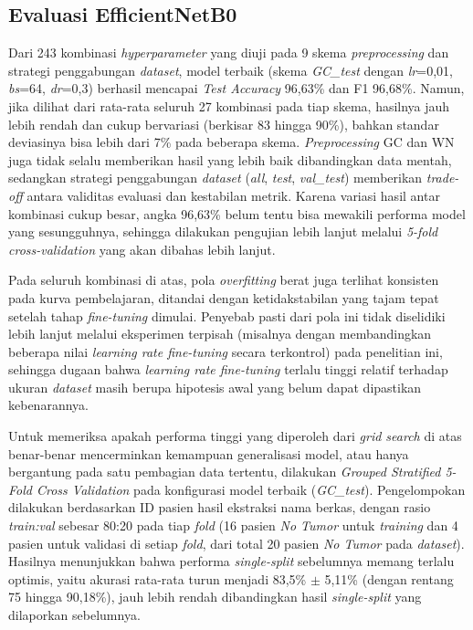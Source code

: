 \subsection{Evaluasi EfficientNetB0}
\label{subsec:efnet}

Dari 243 kombinasi \textit{hyperparameter} yang diuji pada 9 skema \textit{preprocessing} dan strategi penggabungan \textit{dataset}, model terbaik (skema \textit{GC\_test} dengan \textit{lr}=0,01, \textit{bs}=64, \textit{dr}=0,3) berhasil mencapai \textit{Test Accuracy} 96,63\% dan F1 96,68\%. Namun, jika dilihat dari rata-rata seluruh 27 kombinasi pada tiap skema, hasilnya jauh lebih rendah dan cukup bervariasi (berkisar 83 hingga 90\%), bahkan standar deviasinya bisa lebih dari 7\% pada beberapa skema. \textit{Preprocessing} GC dan WN juga tidak selalu memberikan hasil yang lebih baik dibandingkan data mentah, sedangkan strategi penggabungan \textit{dataset} (\textit{all}, \textit{test}, \textit{val\_test}) memberikan \textit{trade-off} antara validitas evaluasi dan kestabilan metrik. Karena variasi hasil antar kombinasi cukup besar, angka 96,63\% belum tentu bisa mewakili performa model yang sesungguhnya, sehingga dilakukan pengujian lebih lanjut melalui \textit{5-fold cross-validation} yang akan dibahas lebih lanjut.

Pada seluruh kombinasi di atas, pola \textit{overfitting} berat juga terlihat konsisten pada kurva pembelajaran, ditandai dengan ketidakstabilan yang tajam tepat setelah tahap \textit{fine-tuning} dimulai. Penyebab pasti dari pola ini tidak diselidiki lebih lanjut melalui eksperimen terpisah (misalnya dengan membandingkan beberapa nilai \textit{learning rate fine-tuning} secara terkontrol) pada penelitian ini, sehingga dugaan bahwa \textit{learning rate fine-tuning} terlalu tinggi relatif terhadap ukuran \textit{dataset} masih berupa hipotesis awal yang belum dapat dipastikan kebenarannya.

Untuk memeriksa apakah performa tinggi yang diperoleh dari \textit{grid search} di atas benar-benar mencerminkan kemampuan generalisasi model, atau hanya bergantung pada satu pembagian data tertentu, dilakukan \textit{Grouped Stratified 5-Fold Cross Validation} pada konfigurasi model terbaik (\textit{GC\_test}). Pengelompokan dilakukan berdasarkan ID pasien hasil ekstraksi nama berkas, dengan rasio \textit{train:val} sebesar 80:20 pada tiap \textit{fold} (16 pasien \textit{No Tumor} untuk \textit{training} dan 4 pasien untuk validasi di setiap \textit{fold}, dari total 20 pasien \textit{No Tumor} pada \textit{dataset}). Hasilnya menunjukkan bahwa performa \textit{single-split} sebelumnya memang terlalu optimis, yaitu akurasi rata-rata turun menjadi 83,5\% $\pm$ 5,11\% (dengan rentang 75 hingga 90,18\%), jauh lebih rendah dibandingkan hasil \textit{single-split} yang dilaporkan sebelumnya.

